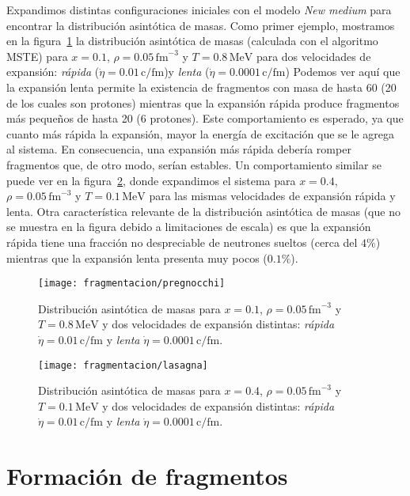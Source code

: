 Expandimos distintas configuraciones iniciales con el modelo \emph{New medium} para encontrar la distribución asintótica de masas.
Como primer ejemplo, mostramos en la figura~\ref{fig:asymp_preg} la distribución asintótica de masas (calculada con el algoritmo MSTE) para $x = 0.1$, $\rho = 0.05\,\text{fm}^{-3}$ y $T = 0.8\,\text{MeV}$ para dos velocidades de expansión: \emph{rápida} ($\dot{\eta} = 0.01\,\text{c/fm}$)y \emph{lenta} ($\dot{\eta} = 0.0001\,\text{c/fm}$)
Podemos ver aquí que la expansión lenta permite la existencia de fragmentos con masa de hasta 60 (20 de los cuales son protones) mientras que la expansión rápida produce fragmentos más pequeños de hasta 20 (6 protones).
Este comportamiento es esperado, ya que cuanto más rápida la expansión, mayor la energía de excitación que se le agrega al sistema.
En consecuencia, una expansión más rápida debería romper fragmentos que, de otro modo, serían estables.
Un comportamiento similar se puede ver en la figura~\ref{fig:asymp_las}, donde expandimos el sistema para $x = 0.4$, $\rho = 0.05\,\text{fm}^{-3}$ y $T = 0.1\,\text{MeV}$ para las mismas velocidades de expansión rápida y lenta.
Otra característica relevante de la distribución asintótica de masas (que no se muestra en la figura debido a limitaciones de escala) es que la expansión rápida tiene una fracción no despreciable de neutrones sueltos (cerca del $4\%$) mientras que la expansión lenta presenta muy pocos ($0.1\%$).

\begin{figure}[h]
  \texttt{[image: fragmentacion/pregnocchi]}
  \caption{Distribución asintótica de masas para $x = 0.1$, $\rho = 0.05\,\text{fm}^{-3}$ y $T = 0.8\,\text{MeV}$ y dos velocidades de expansión distintas: \emph{rápida} $\dot{\eta} = 0.01\,\text{c/fm}$ y \emph{lenta} $\dot{\eta} = 0.0001\,\text{c/fm}$.}
\label{fig:asymp_preg}
\end{figure}

\begin{figure}[h]
  \texttt{[image: fragmentacion/lasagna]}
  \caption{Distribución asintótica de masas para $x = 0.4$, $\rho = 0.05\,\text{fm}^{-3}$ y $T = 0.1\,\text{MeV}$ y dos velocidades de expansión distintas: \emph{rápida} $\dot{\eta} = 0.01\,\text{c/fm}$ y \emph{lenta} $\dot{\eta} = 0.0001\,\text{c/fm}$.}
\label{fig:asymp_las}
\end{figure}


\section{Formación de fragmentos}
\newcommand{\tabfig}[1]{\texttt{[image: fragmentacion/\#1]}}

